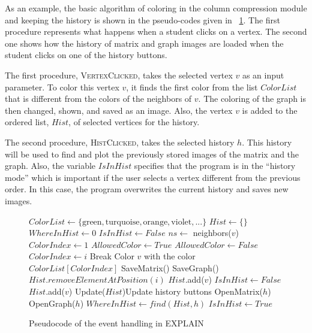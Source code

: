 \documentclass[12pt, twoside,a4paper,toc=bibliography]{scrbook}
\begin{document}
As an example, 
the basic algorithm of coloring in the column compression module and 
keeping the history is shown in the pseudo-codes given in \figurename~\ref{f:alg}. The first procedure represents what happens when a student clicks on a vertex. The second one shows how the history of matrix and graph images are loaded when the student clicks on one of the history buttons.

The first procedure, \textsc{VertexClicked}, takes the selected vertex $v$ as an input parameter. To color this vertex $v$, it finds the first color from the list $ColorList$ that is different from the colors of the neighbors of $v$. The coloring of the graph is then changed, shown, and saved as an image. 
Also, the vertex $v$ is added to the ordered list, $Hist$, of selected vertices for the history.

The second procedure, \textsc{HistClicked}, takes the selected history $h$. This history will be used to find and plot the previously stored images of the matrix and the graph. Also, the variable $IsInHist$ specifies that the program is in the ``history mode'' which is important if the user selects a vertex different from the previous order. In this case, the program overwrites the current history and saves new images.

\begin{figure}
\centering
\begin{algorithmic}[1]
\State $ColorList \gets \{\text{green}, \text{turquoise}, \text{orange}, \text{violet}, ...\}$
\State $Hist \gets \{\}$
\State $WhereInHist \gets 0$
\State $IsInHist \gets False$
\State
{}
\State $ns\gets$ neighbors($v$)
\State $ColorIndex \gets 1$
\State $AllowedColor \gets True$
\State $AllowedColor \gets False$
\EndIf
\EndFor
{}
\State $ColorIndex \gets i$
\State Break
\EndIf
\EndFor
\State Color $v$ with the color $ColorList[ColorIndex]$
\State
{}
\State SaveMatrix()
\State SaveGraph()
\EndIf
{}
\State $Hist.removeElementAtPosition(i)$
\EndFor
\State $Hist$.add($v$)
\State $IsInHist \gets False$
\Else
\State $Hist$.add($v$)
\EndIf
\State Update($Hist$)\Comment Update history buttons
\EndProcedure
\State
\State
{}
\State OpenMatrix($h$)
\State OpenGraph($h$)
\State $WhereInHist \gets find(Hist,h)$
\State $IsInHist \gets True$
\EndProcedure
\end{algorithmic}
\caption{Pseudocode of the event handling in EXPLAIN}
\label{f:alg}
\end{figure}
\end{document}
